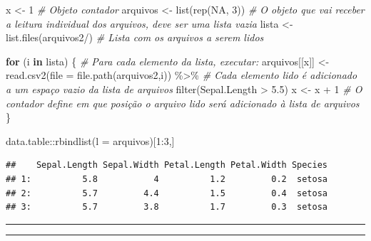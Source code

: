\documentclass[
]{book}
\newenvironment{Shaded}{\begin{snugshade}}{\end{snugshade}}
\newcommand{\AttributeTok}[1]{\textcolor[rgb]{0.77,0.63,0.00}{#1}}
\newcommand{\CommentTok}[1]{\textcolor[rgb]{0.56,0.35,0.01}{\textit{#1}}}
\newcommand{\ConstantTok}[1]{\textcolor[rgb]{0.00,0.00,0.00}{#1}}
\newcommand{\ControlFlowTok}[1]{\textcolor[rgb]{0.13,0.29,0.53}{\textbf{#1}}}
\newcommand{\DecValTok}[1]{\textcolor[rgb]{0.00,0.00,0.81}{#1}}
\newcommand{\FloatTok}[1]{\textcolor[rgb]{0.00,0.00,0.81}{#1}}
\newcommand{\FunctionTok}[1]{\textcolor[rgb]{0.00,0.00,0.00}{#1}}
\newcommand{\NormalTok}[1]{#1}
\newcommand{\OtherTok}[1]{\textcolor[rgb]{0.56,0.35,0.01}{#1}}
\newcommand{\SpecialCharTok}[1]{\textcolor[rgb]{0.00,0.00,0.00}{#1}}
\newcommand{\StringTok}[1]{\textcolor[rgb]{0.31,0.60,0.02}{#1}}
\theoremstyle{definition}
\theoremstyle{definition}
\theoremstyle{definition}
\theoremstyle{definition}
\theoremstyle{remark}
\begin{document}
\begin{Shaded}
\begin{Highlighting}[]
\NormalTok{x }\OtherTok{\textless{}{-}} \DecValTok{1}         \CommentTok{\# Objeto contador}
\NormalTok{arquivos }\OtherTok{\textless{}{-}} \FunctionTok{list}\NormalTok{(}\FunctionTok{rep}\NormalTok{(}\ConstantTok{NA}\NormalTok{, }\DecValTok{3}\NormalTok{)) }\CommentTok{\# O objeto que vai receber a leitura individual dos arquivos, deve ser uma lista vazia}
\NormalTok{lista }\OtherTok{\textless{}{-}} \FunctionTok{list.files}\NormalTok{(}\StringTok{\textquotesingle{}arquivos2/\textquotesingle{}}\NormalTok{) }\CommentTok{\# Lista com os arquivos a serem lidos}

\ControlFlowTok{for}\NormalTok{ (i }\ControlFlowTok{in}\NormalTok{ lista) \{      }\CommentTok{\# Para cada elemento da lista, executar:}
\NormalTok{  arquivos[[x]] }\OtherTok{\textless{}{-}} \FunctionTok{read.csv2}\NormalTok{(}\AttributeTok{file =} \FunctionTok{file.path}\NormalTok{(}\StringTok{\textquotesingle{}arquivos2\textquotesingle{}}\NormalTok{,i)) }\SpecialCharTok{\%\textgreater{}\%}  \CommentTok{\# Cada elemento lido é adicionado a um espaço vazio da lista de arquivos}
    \FunctionTok{filter}\NormalTok{(Sepal.Length }\SpecialCharTok{\textgreater{}} \FloatTok{5.5}\NormalTok{)}
\NormalTok{  x }\OtherTok{\textless{}{-}}\NormalTok{ x }\SpecialCharTok{+} \DecValTok{1}  \CommentTok{\# O contador define em que posição o arquivo lido será adicionado à lista de arquivos}
\NormalTok{\}}

\NormalTok{data.table}\SpecialCharTok{::}\FunctionTok{rbindlist}\NormalTok{(}\AttributeTok{l =}\NormalTok{ arquivos)[}\DecValTok{1}\SpecialCharTok{:}\DecValTok{3}\NormalTok{,]}
\end{Highlighting}
\end{Shaded}

\begin{verbatim}
##    Sepal.Length Sepal.Width Petal.Length Petal.Width Species
## 1:          5.8           4          1.2         0.2  setosa
## 2:          5.7         4.4          1.5         0.4  setosa
## 3:          5.7         3.8          1.7         0.3  setosa
\end{verbatim}

\begin{center}\rule{0.5\linewidth}{0.5pt}\end{center}

\begin{center}\rule{0.5\linewidth}{0.5pt}\end{center}
\end{document}
